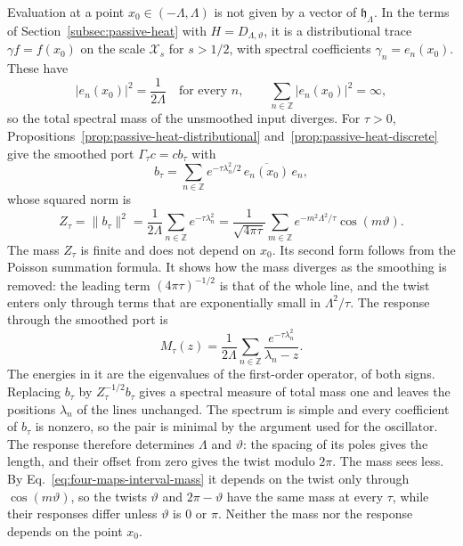 \documentclass[11pt]{article}
\theoremstyle{definition}
\begin{document}
Evaluation at a point $x_0\in(-\Lambda,\Lambda)$ is not given by a vector of $\mathfrak h_\Lambda$. In the terms of Section~\ref{subsec:passive-heat} with $H=D_{\Lambda,\vartheta}$, it is a distributional trace $\gamma f=f(x_0)$ on the scale $\mathcal X_s$ for $s>1/2$, with spectral coefficients $\gamma_n=e_n(x_0)$. These have
\begin{equation}
 |e_n(x_0)|^2=\frac{1}{2\Lambda}\quad\text{for every }n,\qquad\sum_{n\in\mathbb Z}|e_n(x_0)|^2=\infty ,
 \label{eq:four-maps-interval-point}
\end{equation}
so the total spectral mass of the unsmoothed input diverges. For $\tau>0$, Propositions~\ref{prop:passive-heat-distributional} and~\ref{prop:passive-heat-discrete} give the smoothed port $\Gamma_\tau c=cb_\tau$ with
\begin{equation}
 b_\tau=\sum_{n\in\mathbb Z}e^{-\tau\lambda_n^2/2}\,\overline{e_n(x_0)}\,e_n ,
 \label{eq:four-maps-interval-port}
\end{equation}
whose squared norm is
\begin{equation}
 Z_\tau=\|b_\tau\|^2=\frac{1}{2\Lambda}\sum_{n\in\mathbb Z}e^{-\tau\lambda_n^2}
   =\frac{1}{\sqrt{4\pi\tau}}\sum_{m\in\mathbb Z}e^{-m^2\Lambda^2/\tau}\cos(m\vartheta).
 \label{eq:four-maps-interval-mass}
\end{equation}
The mass $Z_\tau$ is finite and does not depend on $x_0$. Its second form follows from the Poisson summation formula. It shows how the mass diverges as the smoothing is removed: the leading term $(4\pi\tau)^{-1/2}$ is that of the whole line, and the twist enters only through terms that are exponentially small in $\Lambda^2/\tau$. The response through the smoothed port is
\begin{equation}
 M_\tau(z)=\frac{1}{2\Lambda}\sum_{n\in\mathbb Z}\frac{e^{-\tau\lambda_n^2}}{\lambda_n-z}.
 \label{eq:four-maps-interval-response}
\end{equation}
The energies in it are the eigenvalues of the first-order operator, of both signs. Replacing $b_\tau$ by $Z_\tau^{-1/2}b_\tau$ gives a spectral measure of total mass one and leaves the positions $\lambda_n$ of the lines unchanged. The spectrum is simple and every coefficient of $b_\tau$ is nonzero, so the pair is minimal by the argument used for the oscillator. The response therefore determines $\Lambda$ and $\vartheta$: the spacing of its poles gives the length, and their offset from zero gives the twist modulo $2\pi$. The mass sees less. By Eq.~\eqref{eq:four-maps-interval-mass} it depends on the twist only through $\cos(m\vartheta)$, so the twists $\vartheta$ and $2\pi-\vartheta$ have the same mass at every $\tau$, while their responses differ unless $\vartheta$ is $0$ or $\pi$. Neither the mass nor the response depends on the point $x_0$.
\end{document}
